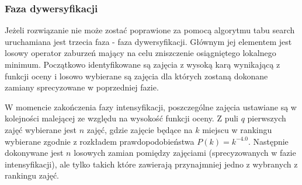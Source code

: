 \subsubsection{Faza dywersyfikacji}
\par Jeżeli rozwiązanie nie może zostać poprawione za pomocą algorytmu tabu search uruchamiana jest trzecia faza - faza dywersyfikacji. Głównym jej elementem jest losowy operator zaburzeń mający na celu zniszczenie osiągniętego lokalnego minimum. Początkowo identyfikowane są zajęcia z wysoką karą wynikającą z funkcji oceny  i losowo wybierane są zajęcia dla których zostaną dokonane zamiany sprecyzowane w poprzedniej fazie.
\par W momencie zakończenia fazy intensyfikacji, poszczególne zajęcia ustawiane są w kolejności malejącej ze względu na wysokość funkcji oceny. Z puli $q$ pierwszych zajęć wybierane jest $n$ zajęć, gdzie zajęcie będące na $k$ miejscu w rankingu wybierane zgodnie z rozkładem prawdopodobieństwa $P(k) = k^{-4.0}$. Następnie dokonywane jest $n$ losowych zamian pomiędzy zajęciami (sprecyzowanych w fazie intensyfikacji), ale tylko takich które zawierają przynajmniej jedno z wybranych z rankingu zajęć. \\





